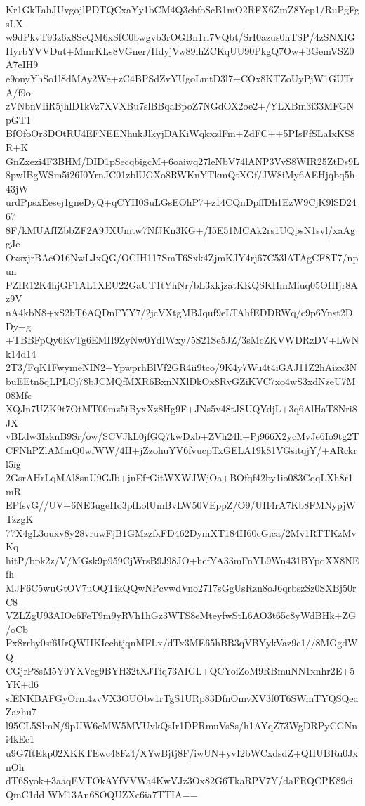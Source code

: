 Kr1GkTahJUvgojlPDTQCxaYy1bCM4Q3chfoScB1mO2RFX6ZmZ8Ycp1/RuPgFgsLX
w9dPkvT93z6x8ScQM6xSfC0bwgvb3rOGBn1rl7VQbt/SrI0azus0hTSP/4zSNXIG
HyrbYVVDut+MmrKLs8VGner/HdyjVw89lhZCKqUU90PkgQ7Ow+3GemVSZ0A7eIH9
e9onyYhSo1l8dMAy2We+zC4BPSdZvYUgoLmtD3l7+COx8KTZoUyPjW1GUTrA/f9o
zVNbnVIiR5jhlD1kVz7XVXBu7slBBqaBpoZ7NGdOX2oe2+/YLXBm3i33MFGNpGT1
BfOfoOr3DOtRU4EFNEENhukJlkyjDAKiWqkxzlFm+ZdFC++5PIsFfSLaIxKS8R+K
GnZxezi4F3BHM/DID1pSecqbigcM+6oaiwq27leNbV74lANP3VvS8WIR25ZtDs9L
8pwIBgWSm5i26I0YrnJC01zblUGXo8RWKnYTkmQtXGf/JW8iMy6AEHjqbq5h43jW
urdPpsxEesej1gneDyQ+qCYH0SuLGsEOhP7+z14CQnDpffDh1EzW9CjK9lSD2467
8F/kMUAfIZbbZF2A9JXUmtw7NfJKn3KG+/I5E51MCAk2rs1UQpsN1svl/xaAggJe
OxsxjrBAcO16NwLJxQG/OCIH117SmT6Sxk4ZjmKJY4rj67C53lATAgCF8T7/npun
PZIR12K4hjGF1AL1XEU22GaUT1tYhNr/bL3xkjzatKKQSKHmMiuq05OHIjr8Az9V
nA4kbN8+xS2bT6AQDnFYY7/2jcVXtgMBJquf9eLTAhfEDDRWq/c9p6Ynst2DDy+g
+TBBFpQy6KvTg6EMII9ZyNw0YdIWxy/5S21Se5JZ/3sMcZKVWDRzDV+LWNk14d14
2T3/FqK1FwymeNIN2+YpwprhBlVf2GR4ii9tco/9K4y7Wu4t4iGAJ11Z2hAizx3N
buEEtn5qLPLCj78bJCMQfMXR6BxnNXlDkOx8RvGZiKVC7xo4wS3xdNzeU7M08Mfc
XQJn7UZK9t7OtMT00mz5tByxXz8Hg9F+JNs5v48tJSUQYdjL+3q6AlHaT8Nri8JX
vBLdw3IzknB9Sr/ow/SCVJkL0jfGQ7kwDxb+ZVh24h+Pj966X2ycMvJe6Io9tg2T
CFNhPZlAMmQ0wfWW/4H+jZzohuYV6fvucpTxGELA19k81VGsitqjY/+ARckrl5ig
2GsrAHrLqMAl8snU9GJb+jnEfrGitWXWJWjOa+BOfqf42by1io083CqqLXh8r1mR
EPfsvG//UV+6NE3ugeHo3pfLolUmBvLW50VEppZ/O9/UH4rA7Kb8FMNypjWTzzgK
77X4gL3ouxv8y28vruwFjB1GMzzfxFD462DymXT184H60cGica/2Mv1RTTKzMvKq
hitP/bpk2z/V/MGsk9p959CjWrsB9J98JO+hcfYA33mFnYL9Wn431BYpqXX8NEfh
MJF6C5wuGtOV7uOQTikQQwNPcvwdVno2717sGgUsRzn8oJ6qrbszSz0SXBj50rC8
VZLZgU93AIOc6FeT9m9yRVh1hGz3WTS8eMteyfwStL6AO3t65c8yWdBHk+ZG/oCb
Px8rrhy0sf6UrQWIIKIechtjqnMFLx/dTx3ME65hBB3qVBYykVaz9e1//8MGgdWQ
CGjrP8sM5Y0YXVcg9BYH32tXJTiq73AIGL+QCYoiZoM9RBmuNN1xnhr2E+5YK+d6
sfENKBAFGyOrm4zvVX3OUObv1rTgS1URp83DfnOmvXV3f0T6SWmTYQSQeaZazhu7
l95CL5SlmN/9pUW6cMW5MVUvkQsIr1DPRmuVsSs/h1AYqZ73WgDRPyCGNni4kEc1
u9G7ftEkp02XKKTEwc48Fz4/XYwBjtj8F/iwUN+yvI2bWCxdsdZ+QHUBRu0JxnOh
dT6Syok+3aaqEVTOkAYfVVWa4KwVJz3Ox82G6TkaRPV7Y/daFRQCPK89ciQmC1dd
WM13An68OQUZXc6ia7TTIA==
